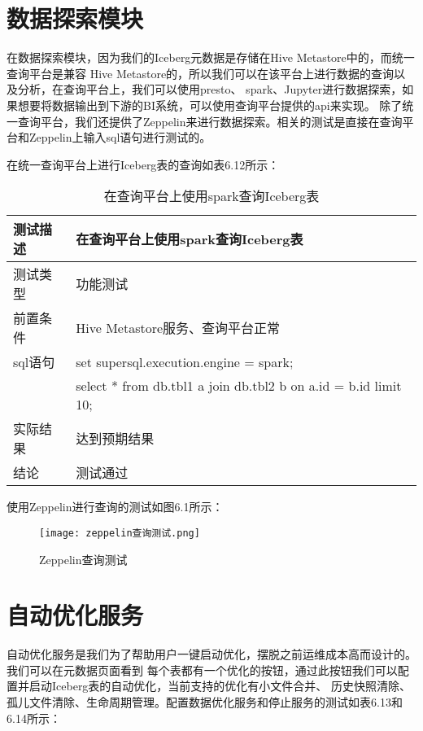 \section{数据探索模块}

在数据探索模块，因为我们的Iceberg元数据是存储在Hive Metastore中的，而统一查询平台是兼容
Hive Metastore的，所以我们可以在该平台上进行数据的查询以及分析，在查询平台上，我们可以使用presto、
spark、Jupyter进行数据探索，如果想要将数据输出到下游的BI系统，可以使用查询平台提供的api来实现。
除了统一查询平台，我们还提供了Zeppelin来进行数据探索。相关的测试是直接在查询平台和Zeppelin上输入sql语句进行测试的。

在统一查询平台上进行Iceberg表的查询如表6.12所示：

\begin{table}[h]
  \centering
  \caption{在查询平台上使用spark查询Iceberg表}
  \label{tab:exampletable}
  \begin{tabular}{ll}
    \toprule
    测试描述         & 在查询平台上使用spark查询Iceberg表         \\
    \midrule
    测试类型         & 功能测试         \\
    前置条件         & Hive Metastore服务、查询平台正常         \\
    sql语句         & set supersql.execution.engine = spark;    \\
                   & select * from db.tbl1 a join db.tbl2 b on a.id = b.id limit 10;       \\
    实际结果         & 达到预期结果           \\
    结论            & 测试通过           \\
    \bottomrule
  \end{tabular}
\end{table}

使用Zeppelin进行查询的测试如图6.1所示：

\begin{figure}[h]
  \centering
  \texttt{[image: zeppelin查询测试.png]}
  \caption{Zeppelin查询测试}
  \label{fig:badge}
\end{figure}

\section{自动优化服务}

自动优化服务是我们为了帮助用户一键启动优化，摆脱之前运维成本高而设计的。我们可以在元数据页面看到
每个表都有一个优化的按钮，通过此按钮我们可以配置并启动Iceberg表的自动优化，当前支持的优化有小文件合并、
历史快照清除、孤儿文件清除、生命周期管理。配置数据优化服务和停止服务的测试如表6.13和6.14所示：

